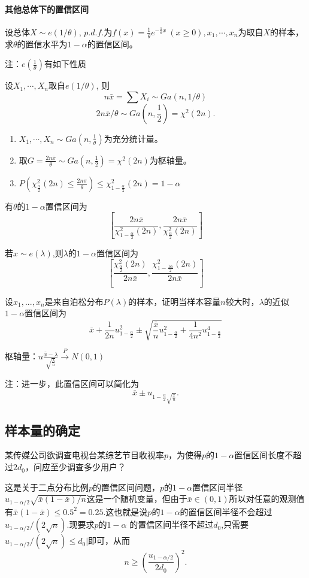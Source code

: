 \paragraph{其他总体下的置信区间}
\begin{example}
    设总体$X\sim e(1/\theta)$, $p.d.f$.为$f(x)=\frac1\theta e^{-\frac{1}{\theta} x}\ (x\geq0),x_1,\cdots,x_n$为取自$X$的样本，求$\theta$的置信水平为$1-\alpha$的置信区间。
\end{example}
注：$e(\frac{1}{\theta})$有如下性质

设$X_1,\cdots,X_n$取自$e(1/\theta)$, 则
$$
    n\bar{x}=\sum X_i\sim Ga(n,1/\theta)
$$
$$
    2n\bar{x}/\theta\sim Ga(n,\frac{1}{2})=\chi^2(2n).
$$
\begin{enumerate}
    \item $X_1,\cdots,X_n \sim Ga(n,\frac{1}{\theta})$为充分统计量。
    \item 取$G= \frac{2n\bar{x}}{\theta} \sim Ga(n,\frac{1}{2})=\chi^2(2n) $为枢轴量。
    \item $P(\chi^2_{\frac{\alpha}{2}}(2n)\leq \frac{2n\pi}{\theta}) \leq \chi^2_{1-\frac{\alpha}{2}}(2n)=1-\alpha$
\end{enumerate}
有$\theta$的$1-\alpha$置信区间为
$$
    \left[ \frac{2n\bar{x}}{\chi^2_{1-\frac{\alpha}{2}}(2n)},\frac{2n\bar{x}}{\chi^2_{\frac{\alpha}{2}}(2n)} \right]
$$

若$x \sim e(\lambda)$,则$\lambda$的$1-\alpha$置信区间为
$$
    \left[\frac{\chi^2_{\frac{\alpha}{2}}(2n)}{2n\bar{x}},\frac{\chi^2_{1-\frac{1\alpha}{2}}(2n)}{2n\bar{x}} \right]
$$

\begin{example}
    设$x_1,...,x_n$是来自泊松分布$P(\lambda)$的样本，证明当样本容量$n$较大时，$\lambda$的近似$1-\alpha$置信区间为
    $$
        \bar{x}+\frac1{2n}u_{1-\frac\alpha2}^2\pm\sqrt{\frac{\bar{x}}{n}u_{1-\frac\alpha2}^2+\frac1{4n^2}u_{1-\frac\alpha2}^4}
    $$
\end{example}
枢轴量：$u \frac{\bar{x}-\lambda}{\sqrt{\frac{\lambda}{n}}} \xrightarrow{P} N(0,1)$

注：进一步，此置信区间可以简化为
$$
    \bar{x}\pm u_{1-\frac\alpha2\sqrt{\frac{\bar{x}}n}}.
$$

\subsection{样本量的确定}
\begin{example}
    某传媒公司欲调查电视台某综艺节目收视率$p$，为使得$p$的$1-\alpha$置信区间长度不超过$2d_0$，问应至少调查多少用户？
\end{example}
\begin{solution}
    这是关于二点分布比例$p$的置信区间问题，$p$的$1-\alpha$置信区间半径$u_{1-\alpha/2}\sqrt{\bar{x}(1-\bar{x})/n}$这是一个随机变量，但由于$\bar{x} \in (0,1)$所以对任意的观测值有${\bar{x}}(1-{\bar{x}})\leq0.5^{2}=0.25.$这也就是说$p$的$1 - \alpha $的置信区间半径不会超过$u_{1-\alpha/2}/(2\sqrt{n}).$现要求$p$的$1-\alpha$ 的置信区间半径不超过$d_0$,只需要$u_{1-\alpha/2}/(2\sqrt{n})\leq d_0|$即可，从而
    $$
        n\geqslant\left(\frac{u_{1-\alpha/2}}{2d_0}\right)^2.
    $$
\end{solution}
